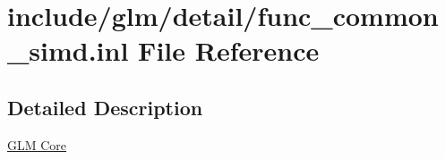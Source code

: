 \hypertarget{func__common__simd_8inl}{}\section{include/glm/detail/func\+\_\+common\+\_\+simd.inl File Reference}
\label{func__common__simd_8inl}


\subsection{Detailed Description}
\hyperlink{group__core}{G\+LM Core} 